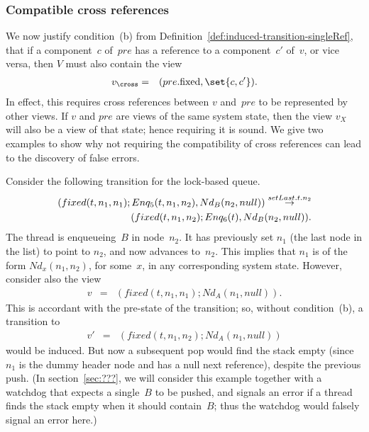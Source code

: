 
\subsubsection{Compatible cross references}
\label{ssec:cross-refs}

We now justify condition~(b) from
Definition~\ref{def:induced-transition-singleRef}, that if a component~$c$
of~$pre$ has a reference to a component~$c'$ of~$v$, or vice versa, then $V$
must also contain the view
\begin{eqnarray*}
v_\cross & = & (pre.\fixed, \set{c, c'}).
\end{eqnarray*} 
In effect, this requires cross references between $v$ and~$pre$ to be
represented by other views.  If $v$ and $pre$ are views of the same system
state, then the view $v_X$ will also be a view of that state; hence requiring
it is sound.
%
We give two examples to show why not requiring the compatibility of cross
references can lead to the discovery of false errors. 

Consider the following transition for the lock-based queue.
\[
\begin{align}
(fixed(t, n_1, n_1); Enq_5(t, n_1, n_2), Nd_B(n_2, null)) 
  \stackrel{setLast.t.n_2}\rightarrow \\
\qquad (fixed(t, n_1, n_2); Enq_6(t), Nd_B(n_2, null)).
\end{align}
\]
The thread is enqueueing~$B$ in node~$n_2$.  It has previously set $n_1$ (the
last node in the list) to point to $n_2$, and now advances 
to~$n_2$.  This implies that $n_1$ is of the form $Nd_x(n_1, n_2)$, for
some~$x$, in any corresponding system state.  However, consider also the view
%
\begin{eqnarray*}
v & = & (fixed(t, n_1, n_1) ; Nd_A(n_1, null)).
\end{eqnarray*}
This is accordant with the pre-state of the transition; so, without
condition~(b), a transition to
\begin{eqnarray*}
v' & = & (fixed(t, n_1, n_2) ; Nd_A(n_1, null))
\end{eqnarray*}
would be induced.  But now a subsequent pop would find the stack empty (since
$n_1$ is the dummy header node and has a null next reference), despite the
previous push.  (In section~\ref{sec:???}, we will consider this example
together with a watchdog that expects a single~$B$ to be pushed, and signals
an error if a thread finds the stack empty when it should contain~$B$; thus
the watchdog would falsely signal an error here.)

